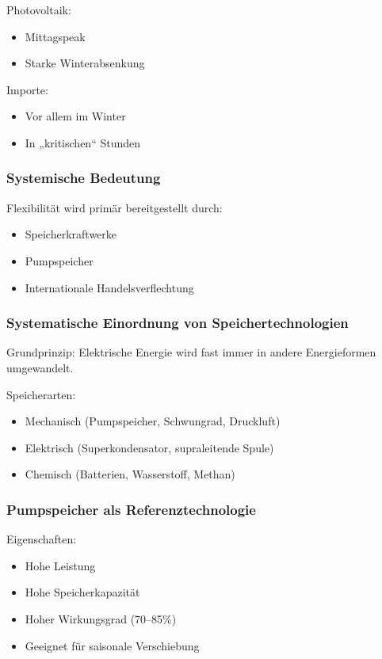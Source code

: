 Photovoltaik:

\begin{itemize}
\item Mittagspeak
\item Starke Winterabsenkung
\end{itemize}

Importe:

\begin{itemize}
\item Vor allem im Winter
\item In „kritischen“ Stunden
\end{itemize}

\subsubsection{Systemische Bedeutung}

Flexibilität wird primär bereitgestellt durch:

\begin{itemize}
\item Speicherkraftwerke
\item Pumpspeicher
\item Internationale Handelsverflechtung
\end{itemize}

\subsubsection{Systematische Einordnung von Speichertechnologien}

Grundprinzip:
Elektrische Energie wird fast immer in andere Energieformen umgewandelt.

Speicherarten:

\begin{itemize}
\item Mechanisch (Pumpspeicher, Schwungrad, Druckluft)
\item Elektrisch (Superkondensator, supraleitende Spule)
\item Chemisch (Batterien, Wasserstoff, Methan)
\end{itemize}

\subsubsection{Pumpspeicher als Referenztechnologie}

Eigenschaften:

\begin{itemize}
\item Hohe Leistung
\item Hohe Speicherkapazität
\item Hoher Wirkungsgrad (70--85\%)
\item Geeignet für saisonale Verschiebung
\end{itemize}

